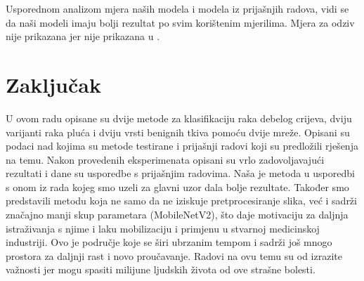 \documentclass[conference, utf8]{IEEEtran}
\begin{document}
	Usporednom analizom mjera naših modela i modela iz prijašnjih radova, vidi se da naši modeli imaju bolji rezultat po svim korištenim mjerilima. Mjera za odziv nije prikazana jer nije prikazana u \cite{RAD2}.
	
	
	\section{Zaključak}
	U ovom radu opisane su dvije metode za klasifikaciju raka debelog crijeva, dviju varijanti raka pluća i dviju vrsti benignih tkiva pomoću dvije mreže. Opisani su podaci nad kojima su metode testirane i prijašnji radovi koji su predložili rješenja na temu. Nakon provedenih eksperimenata opisani su vrlo zadovoljavajući rezultati i dane su usporedbe s prijašnjim radovima. Naša je metoda u usporedbi s onom iz rada kojeg smo uzeli za glavni uzor dala bolje rezultate. Također smo predstavili metodu koja ne samo da ne iziskuje pretprocesiranje slika, već i sadrži značajno manji skup parametara (MobileNetV2), što daje motivaciju za daljnja istraživanja s njime i laku mobilizaciju i primjenu u stvarnoj medicinskoj industriji. Ovo je područje koje se širi ubrzanim tempom i sadrži još mnogo prostora za daljnji rast i novo proučavanje. Radovi na ovu temu su od izrazite važnosti jer mogu spasiti milijune ljudskih života od ove strašne bolesti.
	
	
	
\end{document}
